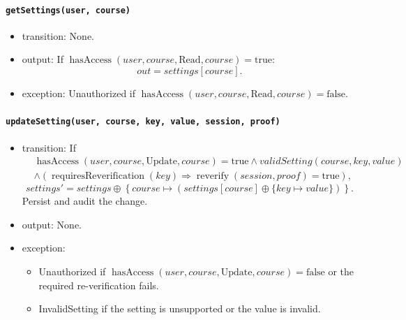 \documentclass[12pt, titlepage]{article}
\begin{document}
\paragraph{\texttt{getSettings(user, course)}}
\begin{itemize}
    \item transition: None.

    \item output: If $\operatorname{hasAccess}(user,course,\text{Read},course)=\text{true}$:
    \[
    out=\mathit{settings}[course].
    \]

    \item exception: Unauthorized if $\operatorname{hasAccess}(user,course,\text{Read},course)=\text{false}$.
\end{itemize}

\paragraph{\texttt{updateSetting(user, course, key, value, session, proof)}}
\begin{itemize}
    \item transition: If
    \[
    \begin{aligned}
    &\operatorname{hasAccess}(user,course,\text{Update},course)=\text{true}
    \land validSetting(course,key,value)\\
    &\land (\operatorname{requiresReverification}(key)\Rightarrow
    \operatorname{reverify}(session,proof)=\text{true}),
    \end{aligned}
    \]
    \[
    \mathit{settings}'=
    \mathit{settings}\oplus
    \left\{
    course\mapsto
    \left(
    \mathit{settings}[course]\oplus
    \{key\mapsto value\}
    \right)
    \right\}.
    \]
    Persist and audit the change.

    \item output: None.

    \item exception:
    \begin{itemize}
        \item Unauthorized if $\operatorname{hasAccess}(user,course,\text{Update},course)=\text{false}$ or the required re-verification fails.
        \item InvalidSetting if the setting is unsupported or the value is invalid.
    \end{itemize}
\end{itemize}
\end{document}
